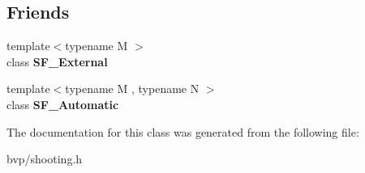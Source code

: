 \subsection*{Friends}
\begin{DoxyCompactItemize}
\item 
\mbox{\label{classShootingFunction_a2049a85c938706b17638057b5ead41f5}} 
{\footnotesize template$<$typename M $>$ }\\class {\bfseries S\+F\+\_\+\+External}
\item 
\mbox{\label{classShootingFunction_a6140f660d0ec9a35ac0517afe096cc12}} 
{\footnotesize template$<$typename M , typename N $>$ }\\class {\bfseries S\+F\+\_\+\+Automatic}
\end{DoxyCompactItemize}


The documentation for this class was generated from the following file\+:\begin{DoxyCompactItemize}
\item 
bvp/shooting.\+h\end{DoxyCompactItemize}
